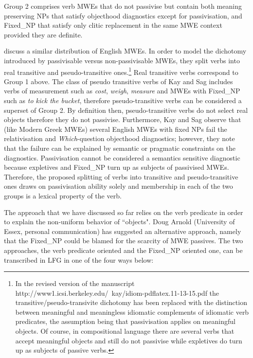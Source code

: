 \documentclass[output=paper]{langsci/langscibook}
\begin{document}
Group 2 comprises verb MWEs that do not passivise but contain both meaning preserving NPs that satisfy objecthood diagnostics except for passivisation, and Fixed\_NP that satisfy only clitic replacement in the same MWE context provided they are definite.  

\citet{kaysagidioms} discuss a similar distribution of English MWEs. In order to model the dichotomy introduced by passivisable versus non-passivisable MWEs, they split verbs into real transitive and pseudo-transitive ones.\footnote{In the revised version of the manuscript http://www1.icsi.berkeley.edu/~kay/idiom-pdflatex.11-13-15.pdf the transitive/pseudo-transivite dichotomy has been replaced with the distinction between meaningful and meaningless idiomatic complements of idiomatic verb predicates, the assumption being that passivisation applies on meaningful objects. Of course, in compositional language there are several verbs that accept meaningful objects and still do not passivise while expletives do turn up as subjects of passive verbs.} Real transitive verbs correspond to Group 1 above. The class of pseudo transitive verbs of Kay and Sag includes verbs of measurement such as \textit{cost}, \textit{weigh}, \textit{measure} and MWEs with Fixed\_NP such as \textit{to kick the bucket}, therefore pseudo-transitive verbs can be considered a superset of Group 2. By definition then, pseudo-transitive verbs do not select real objects therefore they do not passivise.  Furthermore, Kay and Sag observe that (like Modern Greek MWEs) several English MWEs with fixed NPs fail the relativisation and \textit{Which}-question objecthood diagnostics; however, they note that the failure can be explained by semantic or pragmatic constraints on the diagnostics. Passivisation cannot be considered a semantics sensitive diagnostic because expletives and Fixed\_NP turn up as subjects of passivised MWEs. Therefore, the proposed splitting of verbs into transitive and pseudo-transitive ones draws on passivisation ability solely and membership in each of the two groups is a lexical property of the verb. 

The \cite{kaysagidioms} approach that we have discussed so far  relies on the verb predicate in order to explain the non-uniform behavior of ``objects". Doug Arnold (University of Essex, personal communication) has suggested an alternative approach, namely that the Fixed\_NP could be blamed for the scarcity of MWE passives. The two approaches, the verb predicate oriented and the Fixed\_NP oriented one, can be transcribed in LFG in one of the four ways below:
\end{document}

